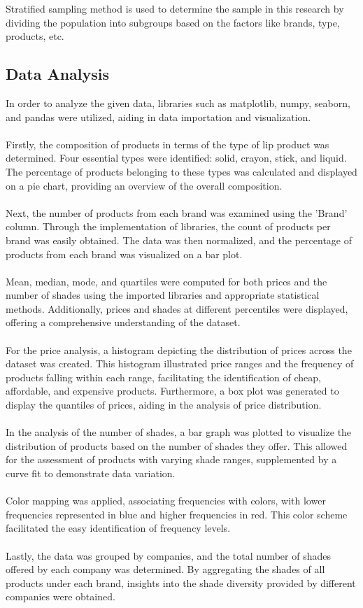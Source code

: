 \documentclass{article}
\begin{document}
\noindent Stratified sampling method is used to determine the sample in this research by dividing the population into subgroups based on the factors like brands, type, products, etc.

\subsection{Data Analysis}

In order to analyze the given data, libraries such as matplotlib, numpy, seaborn, and pandas were utilized, aiding in data importation and visualization.
\\ \\
\noindent Firstly, the composition of products in terms of the type of lip product was determined. Four essential types were identified: solid, crayon, stick, and liquid. The percentage of products belonging to these types was calculated and displayed on a pie chart, providing an overview of the overall composition.
\\ \\
\noindent Next, the number of products from each brand was examined using the 'Brand' column. Through the implementation of libraries, the count of products per brand was easily obtained. The data was then normalized, and the percentage of products from each brand was visualized on a bar plot.
\\ \\
\noindent Mean, median, mode, and quartiles were computed for both prices and the number of shades using the imported libraries and appropriate statistical methods. Additionally, prices and shades at different percentiles were displayed, offering a comprehensive understanding of the dataset.
\\ \\
\noindent For the price analysis, a histogram depicting the distribution of prices across the dataset was created. This histogram illustrated price ranges and the frequency of products falling within each range, facilitating the identification of cheap, affordable, and expensive products. Furthermore, a box plot was generated to display the quantiles of prices, aiding in the analysis of price distribution.
\\ \\
\noindent In the analysis of the number of shades, a bar graph was plotted to visualize the distribution of products based on the number of shades they offer. This allowed for the assessment of products with varying shade ranges, supplemented by a curve fit to demonstrate data variation.
\\ \\
\noindent Color mapping was applied, associating frequencies with colors, with lower frequencies represented in blue and higher frequencies in red. This color scheme facilitated the easy identification of frequency levels.
\\ \\
\noindent Lastly, the data was grouped by companies, and the total number of shades offered by each company was determined. By aggregating the shades of all products under each brand, insights into the shade diversity provided by different companies were obtained.
\end{document}
